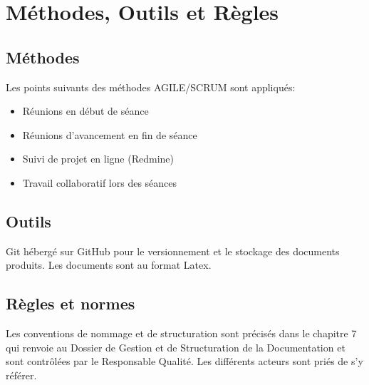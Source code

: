 \section{Méthodes, Outils et Règles}

\subsection{Méthodes}
Les points suivants des méthodes AGILE/SCRUM sont appliqués:
\begin{itemize}
\item Réunions en début de séance
\item Réunions d'avancement en fin de séance
\item Suivi de projet en ligne (Redmine)
\item Travail collaboratif lors des séances
\end{itemize}

\subsection{Outils}
Git hébergé sur GitHub pour le versionnement et le stockage
des documents produits. Les documents sont au format Latex.
\subsection{Règles et normes}
Les conventions de nommage et de structuration sont précisés dans le chapitre 
7 qui renvoie au Dossier de Gestion et de Structuration de la Documentation 
et sont contrôlées par le Responsable Qualité. Les différents acteurs sont 
priés de s'y référer.

